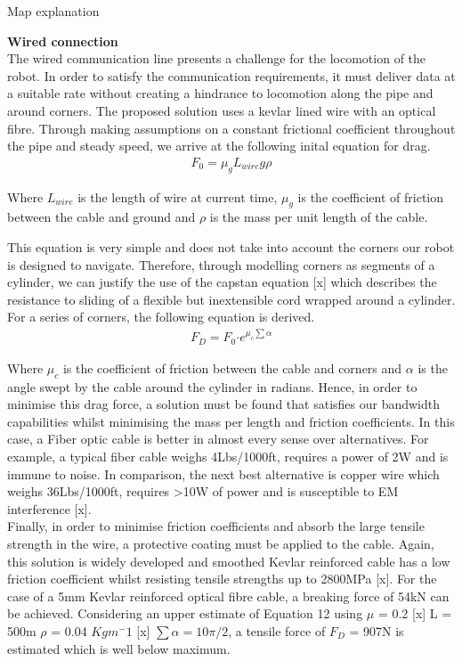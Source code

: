 \documentclass[11pt]{article}		%
\begin{document}
        Map explanation

        \textbf{Wired connection}\\
        The wired communication line presents a challenge for the locomotion of the robot. In order to satisfy the communication requirements, it must deliver data at a suitable rate without creating a hindrance to locomotion along the pipe and around corners. The proposed solution uses a kevlar lined wire with an optical fibre. 
        Through making assumptions on a constant frictional coefficient throughout the pipe and steady speed, we arrive at the following inital equation for drag. 
        \begin{align}
				F_0 = \mu_g L_{wire}   g \rho
		\end{align}
        
        
        Where $L_{wire}$ is the length of wire at current time, $\mu_g$ is the coefficient of friction between the cable and ground and $\rho$ is the mass per unit length of the cable.
        
        This equation is very simple and does not take into account the corners our robot is designed to navigate. Therefore, through modelling corners as segments of a cylinder, we can justify the use of the capstan equation [x] which describes the resistance to sliding of a flexible but inextensible cord wrapped around a cylinder. For a series of corners, the following equation is derived.
        \begin{align}
                F_D = F_0 \boldsymbol{\cdot} {e}^{\mu_c \sum \alpha}
        \end{align}

		Where $\mu_c$ is the coefficient of friction between the cable and corners and $\alpha$ is the angle swept by the cable around the cylinder in radians. 
	    Hence, in order to minimise this drag force, a solution must be found that satisfies our bandwidth capabilities whilst minimising the mass per length and friction coefficients.  
	    In this case, a Fiber optic cable is better in almost every sense over alternatives. For example, a typical fiber cable weighs 4Lbs/1000ft, requires a power of 2W and is immune to noise. In comparison, the next best alternative is copper wire which weighs 36Lbs/1000ft, requires >10W of power and is susceptible to EM interference [x]. \\
	    Finally, in order to minimise friction coefficients and absorb the large tensile strength in the wire, a protective coating must be applied to the cable. Again, this solution is widely developed and smoothed Kevlar reinforced cable has a low friction coefficient whilst resisting tensile strengths up to 2800MPa [x]. For the case of a 5mm Kevlar reinforced optical fibre cable, a breaking force of 54kN can be achieved. Considering an upper estimate of Equation 12 using $\mu$ = 0.2 [x] L = 500m $\rho$ = 0.04 $Kgm^-1$ [x] $\sum \alpha = 10\pi/2$, a tensile force of $F_D$ = 907N is estimated which is well below maximum. 
	    
\end{document}
